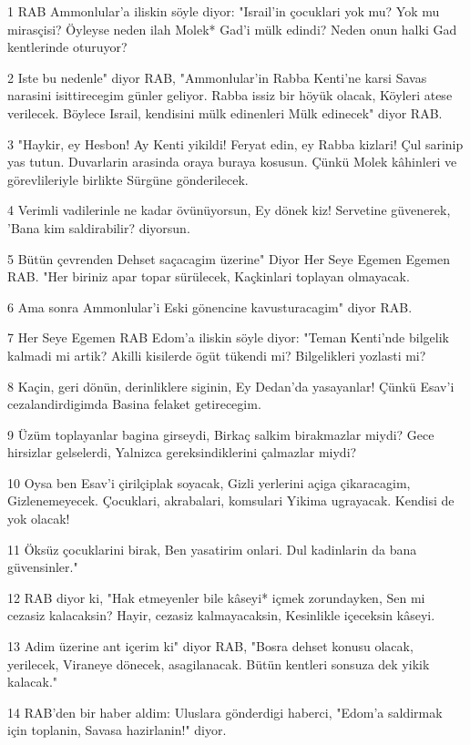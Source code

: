\par 1 RAB Ammonlular'a iliskin söyle diyor: "Israil'in çocuklari yok mu? Yok mu mirasçisi? Öyleyse neden ilah Molek* Gad'i mülk edindi? Neden onun halki Gad kentlerinde oturuyor?
\par 2 Iste bu nedenle" diyor RAB, "Ammonlular'in Rabba Kenti'ne karsi Savas narasini isittirecegim günler geliyor. Rabba issiz bir höyük olacak, Köyleri atese verilecek. Böylece Israil, kendisini mülk edinenleri Mülk edinecek" diyor RAB.
\par 3 "Haykir, ey Hesbon! Ay Kenti yikildi! Feryat edin, ey Rabba kizlari! Çul sarinip yas tutun. Duvarlarin arasinda oraya buraya kosusun. Çünkü Molek kâhinleri ve görevlileriyle birlikte Sürgüne gönderilecek.
\par 4 Verimli vadilerinle ne kadar övünüyorsun, Ey dönek kiz! Servetine güvenerek, 'Bana kim saldirabilir? diyorsun.
\par 5 Bütün çevrenden Dehset saçacagim üzerine" Diyor Her Seye Egemen Egemen RAB. "Her biriniz apar topar sürülecek, Kaçkinlari toplayan olmayacak.
\par 6 Ama sonra Ammonlular'i Eski gönencine kavusturacagim" diyor RAB.
\par 7 Her Seye Egemen RAB Edom'a iliskin söyle diyor: "Teman Kenti'nde bilgelik kalmadi mi artik? Akilli kisilerde ögüt tükendi mi? Bilgelikleri yozlasti mi?
\par 8 Kaçin, geri dönün, derinliklere siginin, Ey Dedan'da yasayanlar! Çünkü Esav'i cezalandirdigimda Basina felaket getirecegim.
\par 9 Üzüm toplayanlar bagina girseydi, Birkaç salkim birakmazlar miydi? Gece hirsizlar gelselerdi, Yalnizca gereksindiklerini çalmazlar miydi?
\par 10 Oysa ben Esav'i çirilçiplak soyacak, Gizli yerlerini açiga çikaracagim, Gizlenemeyecek. Çocuklari, akrabalari, komsulari Yikima ugrayacak. Kendisi de yok olacak!
\par 11 Öksüz çocuklarini birak, Ben yasatirim onlari. Dul kadinlarin da bana güvensinler."
\par 12 RAB diyor ki, "Hak etmeyenler bile kâseyi* içmek zorundayken, Sen mi cezasiz kalacaksin? Hayir, cezasiz kalmayacaksin, Kesinlikle içeceksin kâseyi.
\par 13 Adim üzerine ant içerim ki" diyor RAB, "Bosra dehset konusu olacak, yerilecek, Viraneye dönecek, asagilanacak. Bütün kentleri sonsuza dek yikik kalacak."
\par 14 RAB'den bir haber aldim: Uluslara gönderdigi haberci, "Edom'a saldirmak için toplanin, Savasa hazirlanin!" diyor.
